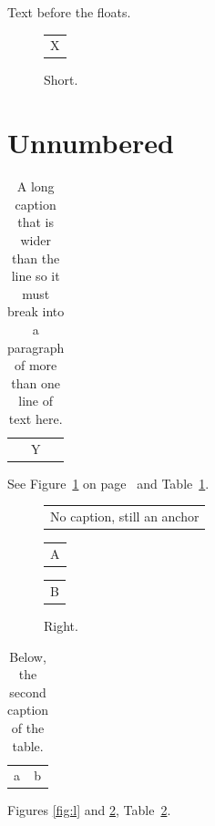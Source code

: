 \documentclass{article}
\begin{document}
Text before the floats.
\begin{figure}[h]
\centering
\begin{tabular}{c}X\end{tabular}
\caption{Short.}
\label{fig:a}
\end{figure}
\section*{Unnumbered}
\begin{table}[h]
\caption{A long caption that is wider than the line so it must break into a paragraph of more than one line of text here.}
\label{tab:b}
\begin{tabular}{c}Y\end{tabular}
\end{table}
See Figure~\ref{fig:a} on page~\pageref{fig:a} and Table~\ref{tab:b}.
\begin{figure}[h]
\centering
\begin{tabular}{c}No caption, still an anchor\end{tabular}
\end{figure}
\begin{figure}[h]
\centering
\begin{minipage}{0.45\textwidth}
\centering
\begin{tabular}{c}A\end{tabular}
\caption{Left, with a caption long enough to take two lines.}\label{fig:l}
\end{minipage}\hfill
\begin{minipage}{0.45\textwidth}
\centering
\begin{tabular}{c}B\end{tabular}
\caption{Right.}\label{fig:r}
\end{minipage}
\end{figure}
\begin{table}[h]
\vspace{20pt}
\caption{Above, after a skip.}
\begin{tabular}{ll}a & b\\\end{tabular}
\caption{Below, the second caption of the table.}\label{tab:c}
\end{table}
Figures \ref{fig:l} and \ref{fig:r}, Table~\ref{tab:c}.
\end{document}
